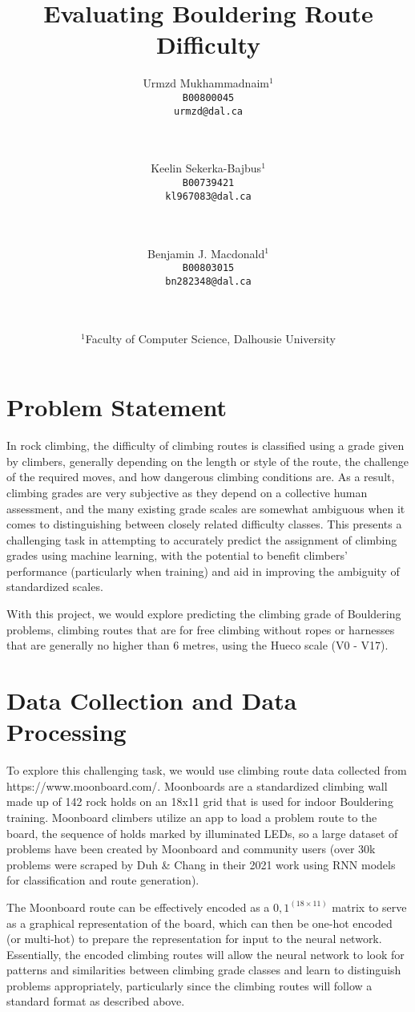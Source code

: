 \documentclass[10pt]{article}
\title{Evaluating Bouldering Route Difficulty}
\author{ Urmzd
  Mukhammadnaim$^1$\\ \texttt{B00800045} \\ \texttt{urmzd@dal.ca} \\ \\ \\ 
  \and
  Keelin Sekerka-Bajbus$^1$\\ \texttt{B00739421}\\ \texttt{kl967083@dal.ca}\\
  \\ \\ 
  \and Benjamin J. Macdonald$^1$\\ \texttt{B00803015}\\
\texttt{bn282348@dal.ca}\\ \\ \\ }
\date{$^1$Faculty of Computer Science, Dalhousie University}
\begin{document}
 \maketitle

\section{Problem Statement}
In rock climbing, the difficulty of climbing routes
is classified using a grade given by climbers, generally depending on the
length or style of the route, the challenge of the required moves, and how
dangerous climbing conditions are. As a result, climbing grades are very
subjective as they depend on a collective human assessment, and the many 
existing grade scales are somewhat ambiguous when it comes to 
distinguishing between closely related difficulty classes. 
This presents a challenging task in attempting to accurately predict the 
assignment of climbing grades using machine learning, with the potential 
to benefit climbers' performance (particularly when training) and aid in
improving the ambiguity of standardized scales.

With this project, we would explore predicting the climbing grade of Bouldering
problems, climbing routes that are for free climbing without ropes or harnesses
that are generally no higher than 6 metres, using the Hueco scale (V0 - V17).

\section{Data Collection and Data Processing}

To explore this challenging task, we would use climbing route data collected
from https://www.moonboard.com/. Moonboards are a standardized climbing wall
made up of 142 rock holds on an 18x11 grid that is used for indoor Bouldering
training. Moonboard climbers utilize an app to load a problem route to the
board, the sequence of holds marked by illuminated LEDs, so a large dataset of
problems have been created by Moonboard and community users (over 30k problems
were scraped by Duh \& Chang in their 2021 work using RNN models for
classification and route generation).

The Moonboard route can be effectively encoded as a ${0, 1}^(18 \times 11)$ matrix to
serve as a graphical representation of the board, which can then be one-hot
encoded (or multi-hot) to prepare the representation for input to the neural
network. Essentially, the encoded climbing routes will allow the neural network
to look for patterns and similarities between climbing grade classes and learn
to distinguish problems appropriately, particularly since the climbing routes
will follow a standard format as described above.
\end{document}
